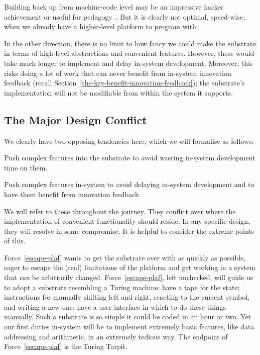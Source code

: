 \documentclass[ twoside,openright,titlepage,numbers=noenddot,headinclude,footinclude,cleardoublepage=empty,abstract=on,
                BCOR=5mm,paper=a4,fontsize=11pt
                ]{scrreprt}
\theoremstyle{definition}
\begin{document}
Building back up from machine-code level may be an impressive hacker
achievement or useful for pedagogy~\parencite{Mu}. But it is clearly not
optimal, speed-wise, when we already have a higher-level platform to
program with.

In the other direction, there is no limit to how fancy we could make the
substrate in terms of high-level abstractions and convenient features.
However, these would take much longer to implement and delay in-system
development. Moreover, this risks doing a lot of work that can never
benefit from in-system innovation feedback (recall
Section~\ref{the-key-benefit-innovation-feedback}); the substrate's
implementation will not be modifiable from within the system it
supports.

\hypertarget{the-major-design-conflict}{\subsection{The Major Design Conflict}\label{the-major-design-conflict}}

We clearly have two opposing tendencies here, which we will formalise as
follows:

\begin{force}
\label{avoid-bp}
Push complex features into the substrate to avoid wasting in-system development time on them.
\end{force}

\begin{force}
\label{escape-plaf}
Push complex features in-system to avoid delaying in-system development and to have them benefit from innovation feedback.
\end{force}

We will refer to these throughout the journey. They conflict over where
the implementation of convenient functionality should reside. In any
specific design, they will resolve in some compromise. It is helpful to
consider the extreme points of this.

Force~\ref{escape-plaf} wants to get the substrate over with as quickly
as possible, eager to escape the (real) limitations of the platform and
get working in a system that \emph{can} be arbitrarily changed.
Force~\ref{escape-plaf}, left unchecked, will guide us to adopt a
substrate resembling a Turing machine: have a tape for the state;
instructions for manually shifting left and right, reacting to the
current symbol, and writing a new one; have a user interface in which to
do these things manually. Such a substrate is so simple it could be
coded in an hour or two. Yet our first duties in-system will be to
implement extremely basic features, like data addressing and arithmetic,
in an extremely tedious way. The endpoint of Force~\ref{escape-plaf} is
the Turing Tarpit.
\end{document}
